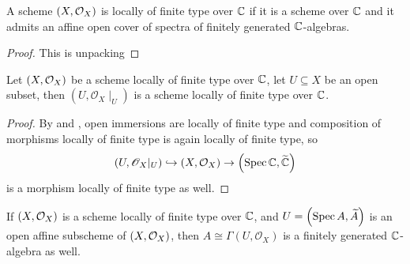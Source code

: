 \begin{lemma}
    A scheme $\left(X, \mathcal{O}_{X}\right)$ is locally of finite type over $\mathbb{C}$ if it is a scheme over $\mathbb{C}$ and it admits an affine open cover of spectra of finitely generated $\mathbb{C}$-algebras.
\end{lemma}

\begin{proof}
    This is unpacking 
\end{proof}


\begin{proposition}
  \leanok{}
  Let $\left(X, \mathcal{O}_{X}\right)$ be a scheme locally of finite type over $\mathbb{C}$, let $U \subseteq X$ be an open subset, then $(U, \mathscr{O}_{X}\mid_{U})$ is a scheme locally of finite type over $\mathbb{C}$.
  \label{thm:restriction-of-scheme-of-finite-type-is-scheme-of-finite-type}
\end{proposition}
\begin{proof}
  By  and , open immersions are locally of finite type and composition of morphisms locally of finite type is again locally of finite type, so
  \[
    \left(U, \mathscr{O}_{X}|_{U}\right) \hookrightarrow \left(X, \mathcal{O}_{X}\right) \to \left(\operatorname*{Spec}{\mathbb{C}}, \widetilde{\mathbb{C}}\right)
  \]
  is a morphism locally of finite type as well.
\end{proof}

\begin{proposition}\label{thm:affine-open-is-finite-algebra}
  If $\left(X, \mathcal{O}_{X}\right)$ is a scheme locally of finite type over $\mathbb{C}$, and $U = \left(\operatorname*{Spec}{A}, \widetilde{A}\right)$ is an open affine subscheme of $\left(X, \mathcal{O}_{X}\right)$, then $A \cong \Gamma(U, \mathscr{O}_{X})$ is a finitely generated $\mathbb{C}$-algebra as well.
  \leanok
\end{proposition}

